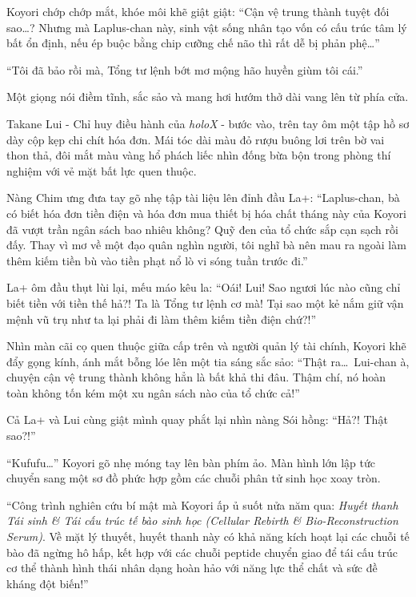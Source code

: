 \documentclass[../main.tex]{subfiles}
\begin{document}
Koyori chớp chớp mắt, khóe môi khẽ giật giật: ``Cận vệ trung thành tuyệt đối sao\dots? Nhưng mà Laplus-chan này, sinh vật sống nhân tạo vốn có cấu trúc tâm lý bất ổn định, nếu ép buộc bằng chip cưỡng chế não thì rất dễ bị phản phệ\dots''

``Tôi đã bảo rồi mà, Tổng tư lệnh bớt mơ mộng hão huyền giùm tôi cái.''

Một giọng nói điềm tĩnh, sắc sảo và mang hơi hướm thở dài vang lên từ phía cửa.

Takane Lui - Chỉ huy điều hành của \textit{holoX} - bước vào, trên tay ôm một tập hồ sơ dày cộp kẹp chi chít hóa đơn. Mái tóc dài màu đỏ rượu buông lơi trên bờ vai thon thả, đôi mắt màu vàng hổ phách liếc nhìn đống bừa bộn trong phòng thí nghiệm với vẻ mặt bất lực quen thuộc.

Nàng Chim ưng đưa tay gõ nhẹ tập tài liệu lên đỉnh đầu La+: ``Laplus-chan, bà có biết hóa đơn tiền điện và hóa đơn mua thiết bị hóa chất tháng này của Koyori đã vượt trần ngân sách bao nhiêu không? Quỹ đen của tổ chức sắp cạn sạch rồi đấy. Thay vì mơ về một đạo quân nghìn người, tôi nghĩ bà nên mau ra ngoài làm thêm kiếm tiền bù vào tiền phạt nổ lò vi sóng tuần trước đi.''

La+ ôm đầu thụt lùi lại, mếu máo kêu la: ``Oái! Lui! Sao ngươi lúc nào cũng chỉ biết tiền với tiền thế hả?! Ta là Tổng tư lệnh cơ mà! Tại sao một kẻ nắm giữ vận mệnh vũ trụ như ta lại phải đi làm thêm kiếm tiền điện chứ?!''

Nhìn màn cãi cọ quen thuộc giữa cấp trên và người quản lý tài chính, Koyori khẽ đẩy gọng kính, ánh mắt bỗng lóe lên một tia sáng sắc sảo: ``Thật ra\dots\ Lui-chan à, chuyện cận vệ trung thành không hẳn là bất khả thi đâu. Thậm chí, nó hoàn toàn không tốn kém một xu ngân sách nào của tổ chức cả!''

Cả La+ và Lui cùng giật mình quay phắt lại nhìn nàng Sói hồng: ``Hả?! Thật sao?!''

``Kufufu\dots'' Koyori gõ nhẹ móng tay lên bàn phím ảo. Màn hình lớn lập tức chuyển sang một sơ đồ phức hợp gồm các chuỗi phân tử sinh học xoay tròn.

``Công trình nghiên cứu bí mật mà Koyori ấp ủ suốt nửa năm qua: \textit{Huyết thanh Tái sinh \& Tái cấu trúc tế bào sinh học (Cellular Rebirth \& Bio-Reconstruction Serum)}. Về mặt lý thuyết, huyết thanh này có khả năng kích hoạt lại các chuỗi tế bào đã ngừng hô hấp, kết hợp với các chuỗi peptide chuyển giao để tái cấu trúc cơ thể thành hình thái nhân dạng hoàn hảo với năng lực thể chất và sức đề kháng đột biến!''
\end{document}
